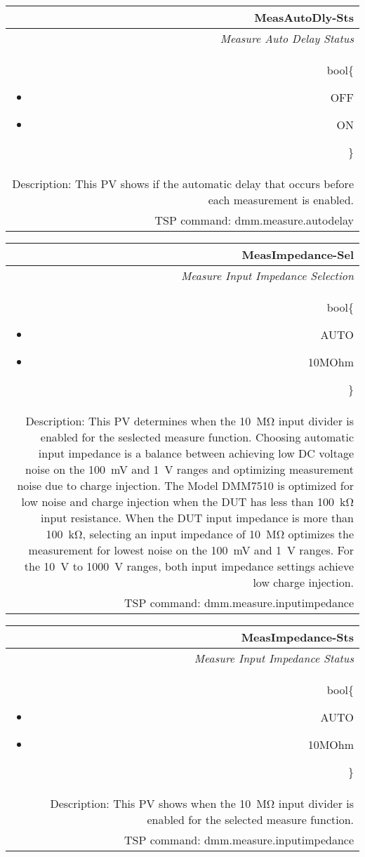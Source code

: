 \documentclass[openany]{article}
\begin{document}
		\begin{tabular}{N}
			\hline
			\bfseries MeasAutoDly-Sts\label{pv:measautodly-sts} \\ \hline
			\emph{Measure Auto Delay Status} \\
			bool\{\begin{itemize}[noitemsep]
				\small
				\item[] OFF
				\item[] ON
			\end{itemize}\} \\
			Description: This PV shows if the automatic delay that occurs before each measurement is enabled. \\
			TSP command: dmm.measure.autodelay
		\end{tabular}

		\begin{tabular}{N}
			\hline
			\bfseries MeasImpedance-Sel\label{pv:measimpedance-sel} \\ \hline
			\emph{Measure Input Impedance Selection} \\
			bool\{\begin{itemize}[noitemsep]
				\small
				\item[] AUTO
				\item[] 10MOhm
			\end{itemize}\} \\
			Description: This PV determines when the \SI{10}{\mega\ohm} input divider is enabled for the seslected measure function. Choosing automatic input impedance is a balance between achieving low DC voltage noise on the \SI{100}{\milli\volt} and \SI{1}{\volt} ranges and optimizing measurement noise due to charge injection. The Model DMM7510 is optimized for low noise and charge injection when the DUT has less than \SI{100}{\kilo\ohm} input resistance. When the DUT input impedance is more than \SI{100}{\kilo\ohm}, selecting an input impedance of \SI{10}{\mega\ohm} optimizes the measurement for lowest noise on the \SI{100}{\milli\volt} and \SI{1}{\volt} ranges. For the \SI{10}{\volt} to \SI{1000}{\volt} ranges, both input impedance settings achieve low charge injection. \\
			TSP command: dmm.measure.inputimpedance
		\end{tabular}

		\begin{tabular}{N}
			\hline
			\bfseries MeasImpedance-Sts\label{pv:measimpedance-sts} \\ \hline
			\emph{Measure Input Impedance Status} \\
			bool\{\begin{itemize}[noitemsep]
				\small
				\item[] AUTO
				\item[] 10MOhm
			\end{itemize}\} \\
			Description: This PV shows when the \SI{10}{\mega\ohm} input divider is enabled for the selected measure function. \\
			TSP command: dmm.measure.inputimpedance
		\end{tabular}
\end{document}
